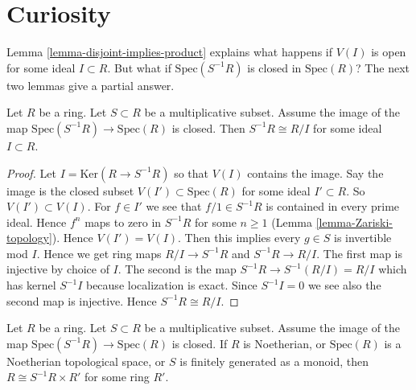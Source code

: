 \section{Curiosity}
\label{section-curiosity}

\noindent
Lemma \ref{lemma-disjoint-implies-product}
explains what happens if $V(I)$ is open for some ideal $I \subset R$.
But what if $\text{Spec}(S^{-1}R)$ is closed in $\text{Spec}(R)$?
The next two lemmas give a partial answer.

\begin{lemma}
\label{lemma-invert-closed-quotient}
Let $R$ be a ring. Let $S \subset R$ be a multiplicative subset.
Assume the image of the map $\text{Spec}(S^{-1}R) \to \text{Spec}(R)$
is closed. Then $S^{-1}R \cong R/I$ for some ideal $I \subset R$.
\end{lemma}

\begin{proof}
Let $I = \text{Ker}(R \to S^{-1}R)$ so that $V(I)$ contains the image.
Say the image is the closed subset $V(I') \subset \text{Spec}(R)$ for
some ideal $I' \subset R$. So $V(I') \subset V(I)$.
For $f \in I'$ we see that $f/1 \in S^{-1}R$
is contained in every prime ideal. Hence $f^n$ maps to zero in $S^{-1}R$
for some $n \geq 1$ (Lemma \ref{lemma-Zariski-topology}).
Hence $V(I') = V(I)$.
Then this implies every $g \in S$ is invertible mod $I$.
Hence we get ring maps $R/I \to S^{-1}R$ and $S^{-1}R \to R/I$.
The first map is injective by choice of $I$.
The second is the map $S^{-1}R \to S^{-1}(R/I) = R/I$ which
has kernel $S^{-1}I$ because localization is exact.
Since $S^{-1}I = 0$ we see also the second map is injective.
Hence $S^{-1}R \cong R/I$.
\end{proof}

\begin{lemma}
\label{lemma-invert-closed-split}
Let $R$ be a ring. Let $S \subset R$ be a multiplicative subset.
Assume the image of the map $\text{Spec}(S^{-1}R) \to \text{Spec}(R)$
is closed. If $R$ is Noetherian, or $\text{Spec}(R)$ is a
Noetherian topological space, or $S$ is finitely generated as a monoid,
then $R \cong S^{-1}R \times R'$ for some ring $R'$.
\end{lemma}

